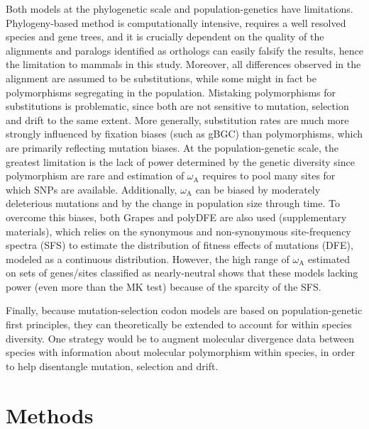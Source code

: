 \documentclass{article}
\begin{document}
Both models at the phylogenetic scale and population-genetics have limitations.
Phylogeny-based method is computationally intensive, requires a well resolved species and gene trees, and it is crucially dependent on the quality of the alignments and paralogs identified as orthologs can easily falsify the results, hence the limitation to mammals in this study.
Moreover, all differences observed in the alignment are assumed to be substitutions, while some might in fact be polymorphisms segregating in the population.
Mistaking polymorphisms for substitutions is problematic, since both are not sensitive to mutation, selection and drift to the same extent\cite{mugal_why_2014}.
More generally, substitution rates are much more strongly influenced by fixation biases (such as gBGC) than polymorphisms, which are primarily reflecting mutation biases.
At the population-genetic scale, the greatest limitation is the lack of power determined by the genetic diversity since polymorphism are rare and estimation of $\omega_{\mathrm{A}}$ requires to pool many sites for which SNPs are available.
Additionally, $\omega_{\mathrm{A}}$ can be biased by moderately deleterious mutations\cite{eyre-walker_quantifying_2002} and by the change in population size through time\cite{eyre-walker_changing_2002}.
To overcome this biases, both Grapes\cite{galtier_adaptive_2016} and polyDFE\cite{tataru_polydfe_2020} are also used (supplementary materials), which relies on the synonymous and non-synonymous site-frequency spectra (SFS) to estimate the distribution of fitness effects of mutations (DFE), modeled as a continuous distribution.
However, the high range of $\omega_{\mathrm{A}}$ estimated on sets of genes/sites classified as nearly-neutral shows that these models lacking power (even more than the MK test) because of the sparcity of the SFS.

Finally, because mutation-selection codon models are based on population-genetic first principles, they can theoretically be extended to account for within species diversity.
One strategy would be to augment molecular divergence data between species with information about molecular polymorphism within species, in order to help disentangle mutation, selection and drift\cite{thorne_codon_2012}.

\section*{Methods}
\end{document}
